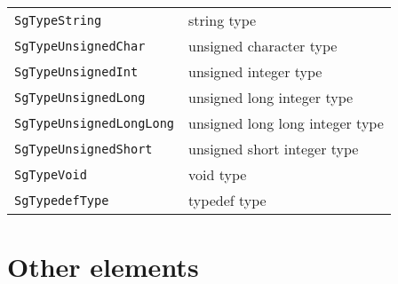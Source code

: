 \begin{longtable}[l]{l|p{10cm}}
 \texttt{SgTypeString}& string type\\
 \texttt{SgTypeUnsignedChar}&unsigned character type\\
 \texttt{SgTypeUnsignedInt}&unsigned integer type\\
 \texttt{SgTypeUnsignedLong}&unsigned long integer type\\
 \texttt{SgTypeUnsignedLongLong}&unsigned long long integer type\\
 \texttt{SgTypeUnsignedShort}&unsigned short integer type\\
 \texttt{SgTypeVoid}&void type\\
 \texttt{SgTypedefType}&typedef type\\
\end{longtable}

\section{Other elements}
